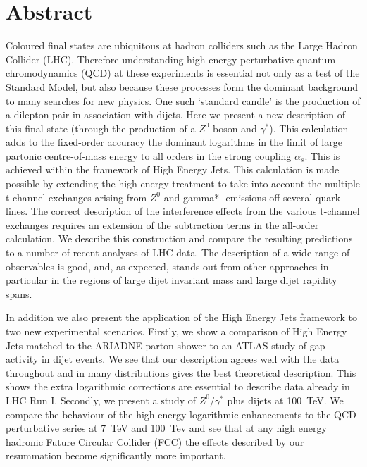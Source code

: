 \vspace{10mm}
\normalsize

\chapter*{Abstract}
\noindent

Coloured final states are ubiquitous at hadron colliders such as the Large Hadron Collider (LHC). Therefore understanding high energy perturbative quantum chromodynamics (QCD) at these experiments is essential not only as a test of the Standard Model, but also because these processes form the dominant background to many searches for new physics.  One such `standard candle' is the production of a dilepton pair in association with dijets.  Here we present a new description of this final state (through the production of a $Z^0$ boson and $\gamma^*$).  This calculation adds to the fixed-order accuracy the dominant logarithms in the limit of large partonic centre-of-mass energy to all orders in the strong coupling $\alpha_s$.  This is achieved within the framework of High Energy Jets.  This calculation is made possible by extending the high energy treatment to take into account the multiple t-channel exchanges arising from $Z^0$ and gamma* -emissions off several quark lines. The correct description of the interference effects from the various t-channel exchanges requires an extension of the subtraction terms in the all-order calculation.  We describe this construction and compare the resulting predictions to a number of recent analyses of LHC data. The description of a wide range of observables is good, and, as expected, stands out from other approaches in particular in the regions of large dijet invariant mass and large dijet rapidity spans.

In addition we also present the application of the High Energy Jets framework to two new experimental scenarios.  Firstly, we show a comparison of High Energy Jets matched to the ARIADNE parton shower to an ATLAS study of gap activity in dijet events. We see that our description agrees well with the data throughout and in many distributions gives the best theoretical description.  This shows the extra logarithmic corrections are essential to describe data already in LHC Run I.  Secondly, we present a study of $Z^0$/$\gamma^*$ plus dijets at 100~TeV.  We compare the behaviour of the high energy logarithmic enhancements to the QCD perturbative series at 7~TeV and 100~Tev and see that at any high energy hadronic Future Circular Collider (FCC) the effects described by our resummation become significantly more important.


\vspace{10mm}
\normalsize

